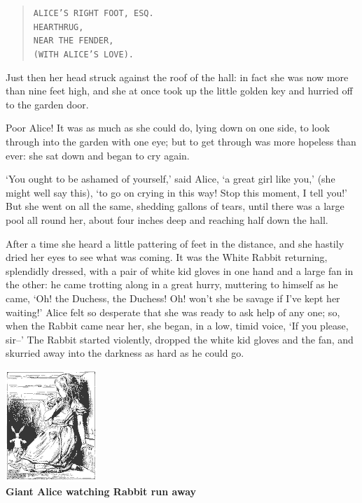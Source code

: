 \documentclass{article}
\begin{document}
\begin{verse}

\texttt{ALICE'S RIGHT FOOT, ESQ.}\\
\hspace{1em}\texttt{HEARTHRUG,}\\
\hspace{2em}\texttt{NEAR THE FENDER,}\\
\hspace{3em}\texttt{(WITH ALICE'S LOVE).}

\end{verse}


Just then her head struck against the roof of the hall: in fact she was now more than nine feet high, and she at once took up the little golden key and hurried off to the garden door.

Poor Alice! It was as much as she could do, lying down on one side, to look through into the garden with one eye; but to get through was more hopeless than ever: she sat down and began to cry again.

`You ought to be ashamed of yourself,' said Alice, `a great girl like you,' (she might well say this), `to go on crying in this way! Stop this moment, I tell you!' But she went on all the same, shedding gallons of tears, until there was a large pool all round her, about four inches deep and reaching half down the hall.

After a time she heard a little pattering of feet in the distance, and she hastily dried her eyes to see what was coming. It was the White Rabbit returning, splendidly dressed, with a pair of white kid gloves in one hand and a large fan in the other: he came trotting along in a great hurry, muttering to himself as he came, `Oh! the Duchess, the Duchess! Oh! won't she be savage if I've kept her waiting!' Alice felt so desperate that she was ready to ask help of any one; so, when the Rabbit came near her, she began, in a low, timid voice, `If you please, sir--' The Rabbit started violently, dropped the white kid gloves and the fan, and skurried away into the darkness as hard as he could go.

\begin{center}
    \includegraphics{RabbitRun}\\
    \textbf{Giant Alice watching Rabbit run away}
\end{center}
\end{document}

